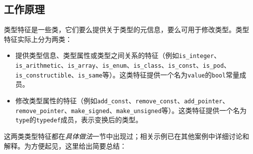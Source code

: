 
\subsection{工作原理}



类型特征是一些类，它们要么提供关于类型的元信息，要么可用于修改类型。类型特征实际上分为两类：



\begin{itemize}
\item 提供类型信息、类型属性或类型之间关系的特征（例如\texttt{is\_\allowbreak{}integer}、\texttt{is\_\allowbreak{}arithmetic}、\texttt{is\_\allowbreak{}array}、\texttt{is\_\allowbreak{}enum}、\texttt{is\_\allowbreak{}class}、\texttt{is\_\allowbreak{}const}、\texttt{is\_\allowbreak{}pod}、\texttt{is\_\allowbreak{}constructible}、\texttt{is\_\allowbreak{}same}等）。这类特征提供一个名为\texttt{value}的\texttt{bool}常量成员。



\item 修改类型属性的特征（例如\texttt{add\_\allowbreak{}const}、\texttt{remove\_\allowbreak{}const}、\texttt{add\_\allowbreak{}pointer}、\texttt{remove\_\allowbreak{}pointer}、\texttt{make\_\allowbreak{}signed}、\texttt{make\_\allowbreak{}unsigned}等）。这类特征提供一个名为\texttt{type}的\texttt{typedef}成员，表示变换后的类型。


\end{itemize}



这两类类型特征都在\textit{具体做法}一节中出现过；相关示例已在其他案例中详细讨论和解释。为方便起见，这里给出简要总结：



